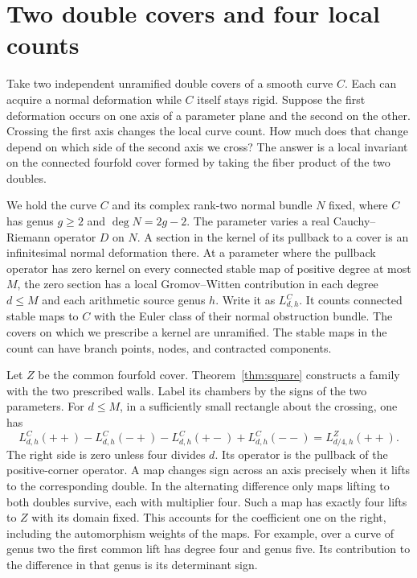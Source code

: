 \section{Two double covers and four local counts}\label{sec:intro}

Take two independent unramified double covers of a smooth curve $C$.
Each can acquire a normal deformation while $C$ itself stays rigid.
Suppose the first deformation occurs on one axis of a parameter plane
and the second on the other. Crossing the first axis changes the local
curve count. How much does that change depend on which side of the
second axis we cross? The answer is a local invariant on the connected
fourfold cover formed by taking the fiber product of the two doubles.

We hold the curve $C$ and its complex rank-two normal bundle $N$ fixed,
where $C$ has genus $g\ge2$ and $\deg N=2g-2$. The parameter varies a
real Cauchy--Riemann operator $D$ on $N$. A section in the kernel of
its pullback to a cover is an infinitesimal normal deformation there.
At a parameter where the pullback operator has zero kernel on every
connected stable map of positive degree at most $M$, the
zero section has a local Gromov--Witten contribution in each degree
$d\le M$ and each arithmetic source genus $h$. Write it as $L^C_{d,h}$.
It counts connected stable maps to $C$ with the Euler class of their
normal obstruction bundle. The covers on which we prescribe a kernel
are unramified. The stable maps in the count can have branch points,
nodes, and contracted components.

Let $Z$ be the common fourfold cover. Theorem~\ref{thm:square}
constructs a family with the two prescribed walls. Label its chambers
by the signs of the two parameters. For $d\le M$, in a sufficiently
small rectangle about the crossing, one has
\[
  L^C_{d,h}(++)-L^C_{d,h}(-+)-L^C_{d,h}(+-)+L^C_{d,h}(--)
                    = L^Z_{d/4,h}(++) .
\]
The right side is zero unless four divides $d$. Its operator is the
pullback of the positive-corner operator. A map changes sign across
an axis precisely when it lifts to the corresponding double. In the
alternating difference only maps lifting to both doubles survive,
each with multiplier four. Such a map has exactly four lifts to $Z$
with its domain fixed. This accounts for the coefficient one on the
right, including the automorphism weights of the maps. For example,
over a curve of genus two the first common lift has degree four and
genus five. Its contribution to the difference in that genus is its
determinant sign.

